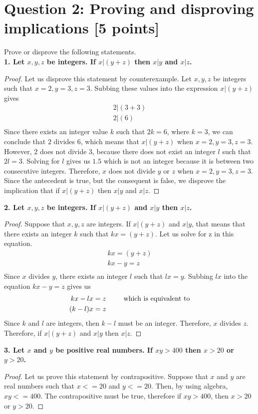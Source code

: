 \documentclass{report}
\theoremstyle{mytheoremstyle}
\theoremstyle{mytheoremstyle}
\theoremstyle{myproblemstyle}
\begin{document}
\section*{\Large{Question 2: Proving and disproving implications [5 points]}}
Prove or disprove the following statements.
\\[\baselineskip]
\textbf{1. Let $x,y,z$ be integers. If $x|(y+z)$ then $x|y$ and $x|z$.}
\begin{proof}
Let us disprove this statement by counterexample. Let $x,y,z$ be integers such that $x=2,y=3,z=3$. Subbing these values into the expression $x|(y+z)$ gives
\begin{align}
2|(3+3) \\
2|(6) \\
\end{align}
Since there exists an integer value $k$ such that $2k=6$, where $k=3$, we can conclude that $2$ divides $6$, which means that $x|(y+z)$ when $x=2,y=3,z=3$. However, $2$ does not divide $3$, because there does not exist an integer $l$ such that $2l=3$. Solving for $l$ gives us $1.5$ which is not an integer because it is between two consecutive integers. Therefore, $x$ does not divide $y$ or $z$ when $x=2,y=3,z=3$. Since the antecedent is true, but the consequent is false, we disprove the implication that if $x|(y+z)$ then $x|y$ and $x|z$.   
\end{proof}
\textbf{2. Let $x,y,z$ be integers. If $x|(y+z)$ and $x|y$ then $x|z$.}
\begin{proof}
Suppose that $x,y,z$ are integers. If $x|(y+z)$ and $x|y$, that means that there exists an integer $k$ such that $kx=(y+z)$. Let us solve for z in this equation.
\begin{align}
kx=(y+z) \\
kx-y=z \\
\end{align}
Since $x$ divides $y$, there exists an integer $l$ such that $lx=y$. Subbing $lx$ into the equation $kx-y=z$ gives us 
\begin{align}
kx-lx&=z&\text{\indent which is equivalent to} \\
(k-l)x&=z
\end{align}
Since $k$ and $l$ are integers, then $k-l$ must be an integer. Therefore, $x$ divides $z$. Therefore, if $x|(y+z)$ and $x|y$ then $x|z$.
\end{proof}
\textbf{3. Let $x$ and $y$ be positive real numbers. If $xy>400$ then $x>20$ or $y>20$.}
\begin{proof}
Let us prove this statement by contrapositive. Suppose that $x$ and $y$ are real numbers such that $x<=20$ and $y<=20$. Then, by using algebra, $xy<=400$. The contrapositive must be true, therefore if $xy>400$, then $x>20$ or $y>20$.
\end{proof}
\newpage
\end{document}

